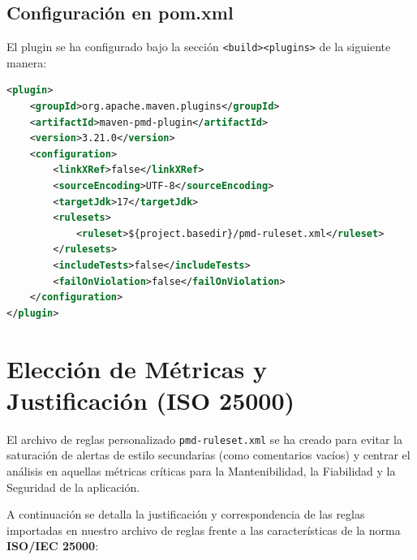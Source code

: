 \documentclass[12pt,a4paper]{article}
\begin{document}
\subsection{Configuración en pom.xml}
El plugin se ha configurado bajo la sección \texttt{<build><plugins>} de la siguiente manera:
\begin{lstlisting}[language=XML]
<plugin>
    <groupId>org.apache.maven.plugins</groupId>
    <artifactId>maven-pmd-plugin</artifactId>
    <version>3.21.0</version>
    <configuration>
        <linkXRef>false</linkXRef>
        <sourceEncoding>UTF-8</sourceEncoding>
        <targetJdk>17</targetJdk>
        <rulesets>
            <ruleset>${project.basedir}/pmd-ruleset.xml</ruleset>
        </rulesets>
        <includeTests>false</includeTests>
        <failOnViolation>false</failOnViolation>
    </configuration>
</plugin>
\end{lstlisting}

\newpage

\section{Elección de Métricas y Justificación (ISO 25000)}
El archivo de reglas personalizado \texttt{pmd-ruleset.xml} se ha creado para evitar la saturación de alertas de estilo secundarias (como comentarios vacíos) y centrar el análisis en aquellas métricas críticas para la Mantenibilidad, la Fiabilidad y la Seguridad de la aplicación.

A continuación se detalla la justificación y correspondencia de las reglas importadas en nuestro archivo de reglas frente a las características de la norma \textbf{ISO/IEC 25000}:
\end{document}
